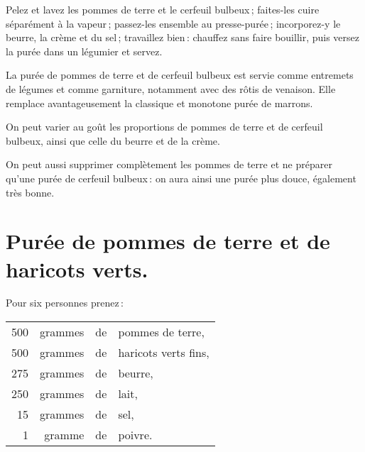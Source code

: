 Pelez et lavez les pommes de terre et le cerfeuil bulbeux ; faites-les cuire
séparément à la vapeur ; passez-les ensemble au presse-purée ; incorporez-y le
beurre, la crème et du sel ; travaillez bien : chauffez sans faire bouillir,
puis versez la purée dans un légumier et servez.

\medskip

La purée de pommes de terre et de cerfeuil bulbeux est servie comme entremets
de légumes et comme garniture, notamment avec des rôtis de venaison. Elle
remplace avantageusement la classique et monotone purée de marrons.

\sk

On peut varier au goût les proportions de pommes de terre et de cerfeuil
bulbeux, ainsi que celle du beurre et de la crème.

\sk

On peut aussi supprimer complètement les pommes de terre et ne préparer qu'une
purée de cerfeuil bulbeux : on aura ainsi une purée plus douce, également très
bonne.

\section*{\centering Purée de pommes de terre et de haricots verts.}
{}

Pour six personnes prenez :

\footnotesize
\begin{longtable}{rrrp{16em}}
    500 & grammes & de & pommes de terre,                                                                 \\
    500 & grammes & de & haricots verts fins,                                                             \\
    275 & grammes & de & beurre,                                                                          \\
    250 & grammes & de & lait,                                                                            \\
     15 & grammes & de & sel,                                                                             \\
      1 & gramme  & de & poivre.                                                                          \\
\end{longtable}
\normalsize

